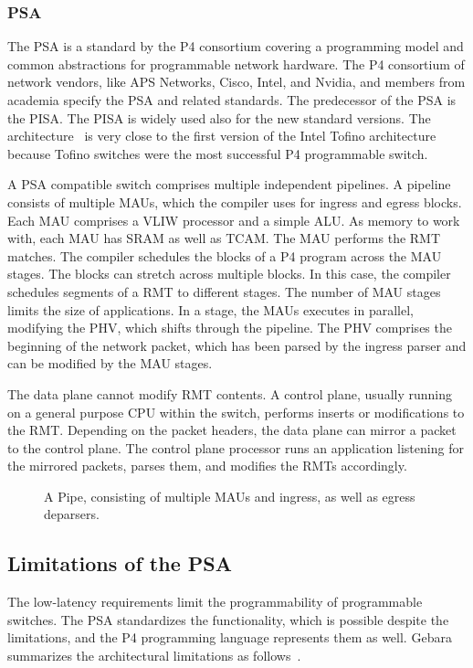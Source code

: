 \subsubsection{\ac{PSA}}
The \ac{PSA} is a standard by the P4 consortium covering a programming model and common abstractions for programmable network hardware. The P4 consortium of network vendors, like APS Networks, Cisco, Intel, and Nvidia, and members from academia specify the \ac{PSA} and related standards. The predecessor of the \ac{PSA} is the \ac{PISA}. The \ac{PISA} is widely used also for the new standard versions. The architecture~\cite{thep4.orgarchitectureworkinggroupP416PortableSwitch2022} is very close to the first version of the Intel Tofino architecture because Tofino switches were the most successful P4 programmable switch.

A \ac{PSA} compatible switch comprises multiple independent pipelines. A pipeline consists of multiple \acp{MAU}, which the compiler uses for ingress and egress blocks.
Each \ac{MAU} comprises a \ac{VLIW} processor and a simple \ac{ALU}. As memory to work with, each \ac{MAU} has \ac{SRAM} as well as \ac{TCAM}. The \ac{MAU} performs the \ac{RMT} matches. The compiler schedules the blocks of a P4 program across the \ac{MAU} stages. The blocks can stretch across multiple blocks. In this case, the compiler schedules segments of a \ac{RMT} to different stages. The number of \ac{MAU} stages limits the size of applications. In a stage, the \acp{MAU} executes in parallel, modifying the \ac{PHV}, which shifts through the pipeline. The \ac{PHV} comprises the beginning of the network packet, which has been parsed by the ingress parser and can be modified by the \ac{MAU} stages.

The data plane cannot modify \ac{RMT} contents. A control plane, usually running on a general purpose \ac{CPU} within the switch, performs inserts or modifications to the \ac{RMT}. Depending on the packet headers, the data plane can mirror a packet to the control plane. The control plane processor runs an application listening for the mirrored packets, parses them, and modifies the \acp{RMT} accordingly.

\begin{figure}[hb]
  \centering
  \resizebox{\textwidth}{!}{
    
  }
  \caption{\label{fig:tofino-pipeline} A \tofino{} Pipe, consisting of multiple \acp{MAU} and ingress, as well as egress deparsers.}
\end{figure}

\subsection{Limitations of the \ac{PSA}}\label{sec:p4-limitations}
The low-latency requirements limit the programmability of programmable switches. The \ac{PSA} standardizes the functionality, which is possible despite the limitations, and the P4 programming language represents them as well. Gebara~\etal{} summarizes the architectural limitations as follows~\cite{gebaraChallengingStatelessQuo2020}\@.

